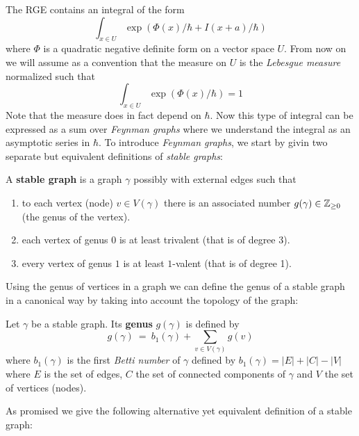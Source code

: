 The RGE contains an integral of the form
$$ \int_{x \in U} \exp(\Phi(x)/\hbar + I(x+a)/\hbar) $$
where $\Phi$ is a quadratic negative definite form on a vector space $U$. From now on we will assume as a convention that the measure on $U$ is the \emph{Lebesgue measure} normalized such that
$$ \int_{x \in U} \exp(\Phi(x)/\hbar) = 1 $$
Note that the measure does in fact depend on $\hbar$. Now this type of integral can be expressed as a sum over \emph{Feynman graphs} where we understand the integral as an asymptotic series in $\hbar$. To introduce \emph{Feynman graphs}, we start by givin two separate but equivalent definitions of \emph{stable graphs}:

\begin{definition}
  A \textbf{stable graph} is a graph $\gamma$ possibly with external edges such that
  \begin{enumerate}
    \item to each vertex (node) $v \in V(\gamma)$ there is an associated number $g(\gamma) \in \mathbb{Z}_{\geq 0}$ (the genus of the vertex).

    \item each vertex of genus $0$ is at least trivalent (that is of degree 3).

    \item every vertex of genus $1$ is at least $1$-valent (that is of degree 1).
  \end{enumerate}
\end{definition}

Using the genus of vertices in a graph we can define the genus of a stable graph in a canonical way by taking into account the topology of the graph:

\begin{definition}
  Let $\gamma$ be a stable graph. Its \textbf{genus} $g(\gamma)$ is defined by
  $$ g(\gamma) \ = \ b_1(\gamma) + \sum_{v\in V(\gamma)} g(v) $$
  where $b_1(\gamma)$ is the first \emph{Betti number} of $\gamma$ defined by $b_1(\gamma) = |E| + |C| - |V|$ where $E$ is the set of edges, $C$ the set of connected components of $\gamma$ and $V$ the set of vertices (nodes).
\end{definition}

As promised we give the following alternative yet equivalent definition of a stable graph:

